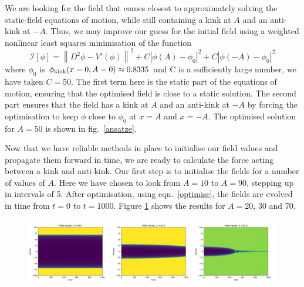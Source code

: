 \documentclass[11pt, oneside]{article}  	%
\numberwithin{equation}{section}
\begin{document}
 We are looking for the field that comes closest to approximately solving the static-field equations of motion, while still containing a kink at $A$ and an anti-kink at $-A$. Thus, we may improve our guess for the initial field using a weighted nonlinear least squares minimisation of the function
 \begin{equation}\label{optimise}
 \mathcal{I}[\phi] = \left \| D^2\phi -V'\left( \phi \right) \right \|^2 + C\left | \phi(A) - \phi_0 \right |^2 + C\left | \phi(-A) - \phi_0 \right |^2
 \end{equation}
 where $\phi_0$ is $\phi_{\textup{kink}}(x=0,A=0) \approx 0.8335$ and C is a sufficiently large number, we have taken $C = 50$. The first term here is the static part of the equations of motion, ensuring that the optimised field is close to a static solution. The second part ensures that the field has a kink at $A$ and an anti-kink at $-A$ by forcing the optimisation to keep $\phi$ close to $\phi_0$ at $x=A$ and $x=-A$. The optimised solution for $A=50$ is shown in fig.~\ref{ansatze}.\par
 Now that we have reliable methods in place to initialise our field values and propagate them forward in time, we are ready to calculate the force acting between a kink and anti-kink. Our first step is to initialise the fields for a number of values of $A$. Here we have chosen to look from $A=10$ to $A = 90$, stepping up in intervals of 5. After optimisation, using eqn.~\ref{optimise}, the fields are evolved in time from $t=0$ to $t=1000$. Figure \ref{field_evolutions} shows the results for $A =$20, 30 and 70.\par
 \begin{figure}
\centering
\includegraphics[width=\textwidth]{field_values}
 \label{field_evolutions}
\end{figure}
\end{document}
